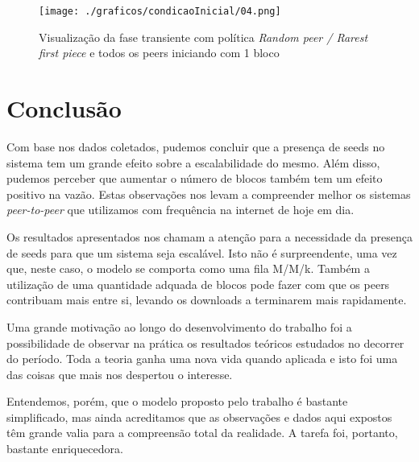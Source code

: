 \documentclass[a4paper,10pt]{article}
\begin{document}
\begin{figure}
	\caption{Visualização da fase transiente com política \textit{Random peer / Rarest first piece} e todos os peers iniciando com 1 bloco}
	\label{figCI1rf}
	\texttt{[image: ./graficos/condicaoInicial/04.png]}
\end{figure}

\clearpage
\pagebreak

\section{Conclusão}

Com base nos dados coletados, pudemos concluir que a presença de seeds no sistema tem um grande efeito sobre a escalabilidade do mesmo. Além disso, pudemos perceber que aumentar o número de blocos também tem um efeito positivo na vazão. Estas observações nos levam a compreender melhor os sistemas \textit{peer-to-peer} que utilizamos com frequência na internet de hoje em dia.

Os resultados apresentados nos chamam a atenção para a necessidade da presença de seeds para que um sistema seja escalável. Isto não é surpreendente, uma vez que, neste caso, o modelo se comporta como uma fila M/M/k. Também a utilização de uma quantidade adquada de blocos pode fazer com que os peers contribuam mais entre si, levando os downloads a terminarem mais rapidamente.

Uma grande motivação ao longo do desenvolvimento do trabalho foi a possibilidade de observar na prática os resultados teóricos estudados no decorrer do período. Toda a teoria ganha uma nova vida quando aplicada e isto foi uma das coisas que mais nos despertou o interesse.

Entendemos, porém, que o modelo proposto pelo trabalho é bastante simplificado, mas ainda acreditamos que as observações e dados aqui expostos têm grande valia para a compreensão total da realidade. A tarefa foi, portanto, bastante enriquecedora.

\pagebreak
\end{document}

